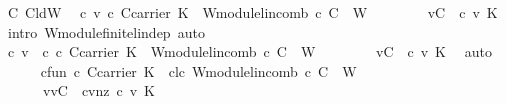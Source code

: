 \begin{isabellebody}
\ C\ CldW\ \isamarkupfalse%
\ {\isachardoublequoteopen}{\isasymexists}c{\isacharprime}\ v{\isacharprime}{\isachardot}\ {\isacharparenleft}c{\isacharprime}{\isasymin}\ {\isacharparenleft}{\isacharquery}C{\isacharprime}{\isasymrightarrow}carrier\ K{\isacharparenright}{\isacharparenright}\ {\isasymand}\ {\isacharparenleft}W{\isachardot}module{\isachardot}lincomb\ c{\isacharprime}\ {\isacharquery}C{\isacharprime}\ {\isacharequal}\ {\isasymzero}\isactrlbsub W\isactrlesub {\isacharparenright}\ \isanewline
\ \ \ \ \ \ {\isasymand}\ {\isacharparenleft}v{\isacharprime}{\isasymin}{\isacharquery}C{\isacharprime}{\isacharparenright}\ {\isasymand}\ {\isacharparenleft}c{\isacharprime}\ v{\isacharprime}{\isasymnoteq}\ {\isasymzero}\isactrlbsub K\isactrlesub {\isacharparenright}{\isachardoublequoteclose}\ \isamarkupfalse%
\ {\isacharparenleft}intro\ W{\isachardot}module{\isachardot}finite{\isacharunderscore}lin{\isacharunderscore}dep{\isacharcomma}\ auto{\isacharparenright}\isanewline
\ \ \ \ \isamarkupfalse%
\ \isamarkupfalse%
\ c{\isacharprime}\ v{\isacharprime}\ \ c{\isacharprime}{\isacharcolon}\ {\isachardoublequoteopen}{\isacharparenleft}c{\isacharprime}{\isasymin}\ {\isacharparenleft}{\isacharquery}C{\isacharprime}{\isasymrightarrow}carrier\ K{\isacharparenright}{\isacharparenright}\ {\isasymand}\ {\isacharparenleft}W{\isachardot}module{\isachardot}lincomb\ c{\isacharprime}\ {\isacharquery}C{\isacharprime}\ {\isacharequal}\ {\isasymzero}\isactrlbsub W\isactrlesub {\isacharparenright}\ \isanewline
\ \ \ \ \ \ {\isasymand}\ {\isacharparenleft}v{\isacharprime}{\isasymin}{\isacharquery}C{\isacharprime}{\isacharparenright}\ {\isasymand}\ {\isacharparenleft}c{\isacharprime}\ v{\isacharprime}{\isasymnoteq}\ {\isasymzero}\isactrlbsub K\isactrlesub {\isacharparenright}{\isachardoublequoteclose}\ \isamarkupfalse%
\ auto\isanewline
\ \ \ \ \isamarkupfalse%
\ c{\isacharprime}fun{\isacharcolon}\ {\isachardoublequoteopen}{\isacharparenleft}c{\isacharprime}{\isasymin}\ {\isacharparenleft}{\isacharquery}C{\isacharprime}{\isasymrightarrow}carrier\ K{\isacharparenright}{\isacharparenright}{\isachardoublequoteclose}\ \ c{\isacharprime}lc{\isacharcolon}\ {\isachardoublequoteopen}{\isacharparenleft}W{\isachardot}module{\isachardot}lincomb\ c{\isacharprime}\ {\isacharquery}C{\isacharprime}\ {\isacharequal}\ {\isasymzero}\isactrlbsub W\isactrlesub {\isacharparenright}{\isachardoublequoteclose}\ \ \isanewline
\ \ \ \ \ \ v{\isacharprime}{\isacharcolon}{\isachardoublequoteopen}{\isacharparenleft}v{\isacharprime}{\isasymin}{\isacharquery}C{\isacharprime}{\isacharparenright}{\isachardoublequoteclose}\ \ cvnz{\isacharcolon}\ {\isachardoublequoteopen}{\isacharparenleft}c{\isacharprime}\ v{\isacharprime}{\isasymnoteq}\ {\isasymzero}\isactrlbsub K\isactrlesub {\isacharparenright}{\isachardoublequoteclose}\ \isamarkupfalse%

\end{isabellebody}
